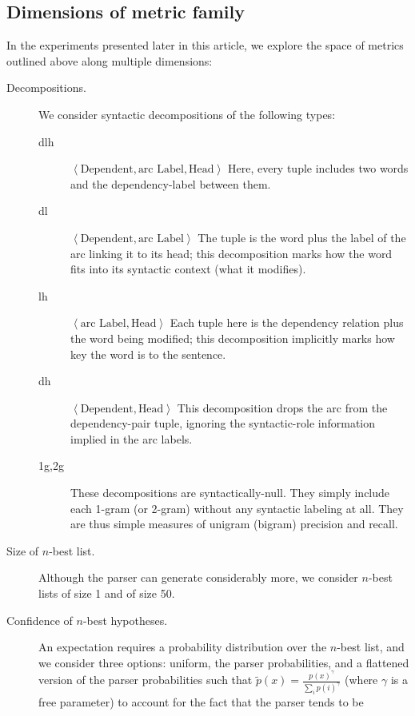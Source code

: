 \documentclass{kluwer}    %
\begin{document}
\begin{article}
\subsection{Dimensions of metric family}
\label{sec:metricdimensions}
In the experiments presented later in this article, we explore the
space of metrics outlined above along multiple dimensions:
\begin{description}
\item[Decompositions.] We consider syntactic decompositions of the
  following types:
  \begin{description}
  \item[dlh] $\left\langle \textrm{Dependent}, \textrm{arc Label},
      \textrm{Head}\right\rangle$ Here, every tuple includes two words
    and the dependency-label between them.
  \item[dl] $\left\langle \textrm{Dependent}, \textrm{arc Label}
      \right\rangle$ The tuple is the word plus the label of the arc
      linking it to its head; this decomposition marks how the word
      fits into its syntactic context (what it modifies).
    \item[lh] $\left\langle \textrm{arc Label}, \textrm{Head}
      \right\rangle$ Each tuple here is the dependency relation plus
      the word being modified; this decomposition implicitly marks how
      key the word is to the sentence.
    \item[dh] $\left\langle \textrm{Dependent}, \textrm{Head}
      \right\rangle$ This decomposition drops the arc from the
      dependency-pair tuple, ignoring the syntactic-role information
      implied in the arc labels.
    \item[1g,2g] These decompositions are syntactically-null.  They
      simply include each 1-gram (or 2-gram) without any syntactic
      labeling at all.  They are thus simple measures of unigram
      (bigram) precision and recall.
  \end{description}
\item[Size of $n$-best list.] Although the parser can generate
  considerably more, we consider $n$-best lists of size 1 and of size
  50.
\item[Confidence of $n$-best hypotheses.] An expectation requires a
  probability distribution over the $n$-best list, and we consider
  three options: uniform, the parser probabilities, and a flattened
  version of the parser probabilities such that $\tilde{p}(x) =
  \frac{p(x)^\gamma}{\sum_ip(i)^\gamma}$ (where $\gamma$ is a free
  parameter) to account for the fact that the parser tends to be

\end{description}
\end{article}
\end{document}
